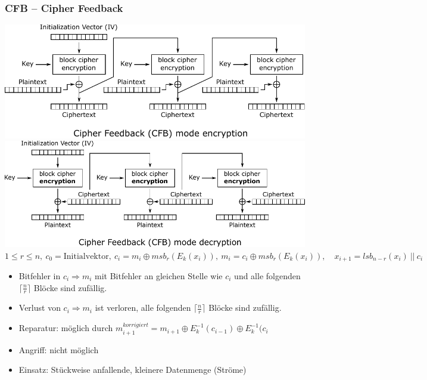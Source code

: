 \documentclass[8pt,a4paper,landscape]{article}
\begin{document}
\begin{multicols}{4}
\subsubsection{CFB – Cipher Feedback}
\includegraphics[width=\columnwidth]{CFB_encryption.pdf}
\includegraphics[width=\columnwidth]{CFB_decryption.pdf}
\(1 \leq r \leq n,~c_0 = \textrm{Initialvektor},~c_i = m_i \oplus msb_{r}(E_k(x_{i})),~m_i = c_i \oplus msb_{r}(E_k(x_{i})), \quad x_{i+1} = lsb_{n-r}(x_{i})~||~c_i\)
\begin{itemize}[itemsep=1pt]
\item Bitfehler in \(c_i \Rightarrow m_i \) mit Bitfehler an gleichen Stelle wie \(c_i\) und alle folgenden $\lceil\frac{n}{r}\rceil$ Blöcke sind zufällig. 
\item Verlust von \(c_i \Rightarrow m_i \) ist verloren, alle folgenden $\lceil\frac{n}{r}\rceil$ Blöcke sind zufällig. 
\item Reparatur: möglich durch $m_{i+1}^{korrigiert} = m_{i+1} \oplus E_k^{-1}(c_{i-1}) \oplus E_k^{-1}(c_{i}$
\item Angriff: nicht möglich
\item Einsatz: Stückweise anfallende, kleinere Datenmenge (Ströme)
\end{itemize}


\end{multicols}
\end{document}
